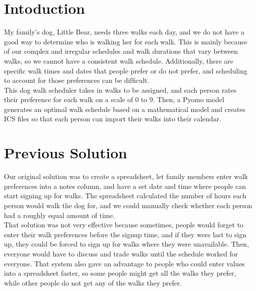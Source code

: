\documentclass{notes}
\begin{document}
\section*{Intoduction}
My family’s dog, Little Bear, needs three walks each day, and we do not have a good way to determine who is walking her for each walk. This is mainly because of our complex and irregular schedules and walk durations that vary between walks, so we cannot have a consistent walk schedule. Additionally, there are speciﬁc walk times and dates that people prefer or do not prefer, and scheduling to account for those preferences can be difﬁcult.\\

This dog walk scheduler takes in walks to be assigned, and each person rates their preference for each walk on a scale of 0 to 9. Then, a Pyomo model generates an optimal walk schedule based on a mathematical model and creates ICS files so that each person can import their walks into their calendar.
\section*{Previous Solution}
Our original solution was to create a spreadsheet, let family members enter walk preferences into a notes column, and have a set date and time where people can start signing up for walks. The spreadsheet calculated the number of hours each person would walk the dog for, and we could manually check whether each person had a roughly equal amount of time.\\

That solution was not very effective because sometimes, people would forget to enter their walk preferences before the signup time, and if they were last to sign up, they could be forced to sign up for walks where they were unavailable. Then, everyone would have to discuss and trade walks until the schedule worked for everyone. That system also gave an advantage to people who could enter values into a spreadsheet faster, so some people might get all the walks they prefer, while other people do not get any of the walks they prefer.
\end{document}
